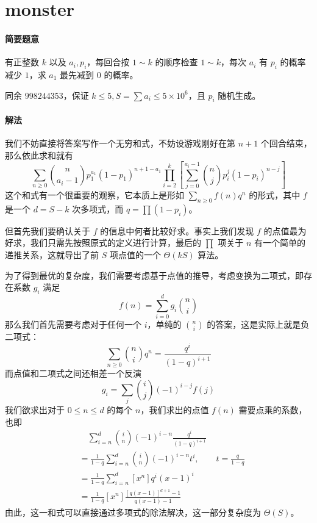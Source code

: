 \documentclass[12pt]{ctexart}
\theoremstyle{theorem}
\theoremstyle{theorem}
\begin{document}
\newpage

\section{monster}

\paragraph{简要题意} 有正整数 $k$ 以及 $a_i, p_i$，每回合按 $1\sim k$ 的顺序检查 $1\sim k$，每次 $a_i$ 有 $p_i$ 的概率减少 $1$，求 $a_1$ 最先减到 $0$ 的概率。

同余 $998244353$，保证 $k\le 5, S=\sum a_i \le 5\times 10^6$，且 $p_i$ 随机生成。

\paragraph{解法}

我们不妨直接将答案写作一个无穷和式，不妨设游戏刚好在第 $n+1$ 个回合结束，那么依此求和就有
$$
\sum_{n\ge 0} \binom n{a_i-1} p_1^{a_1} (1-p_1)^{n+1-a_1} \prod_{i=2}^k
\left[\sum_{j=0}^{a_i-1} \binom n j p_i^j(1-p_i)^{n-j}\right]
$$
这个和式有一个很重要的观察，它本质上是形如 $\sum_{n\ge 0} f(n) q^n$ 的形式，其中 $f$ 是一个 $d=S - k$ 次多项式，而 $q = \prod (1-p_i)$。

但首先我们要确认关于 $f$ 的信息中何者比较好求。事实上我们发现 $f$ 的点值最为好求，我们只需先按照原式的定义进行计算，最后的 $\prod$ 项关于 $n$ 有一个简单的递推关系，这就导出了前 $S$ 项点值的一个 $\Theta(kS)$ 算法。

为了得到最优的复杂度，我们需要考虑基于点值的推导，考虑变换为二项式，即存在系数 $g_i$ 满足
$$
f(n) = \sum_{i=0}^{d} g_i \binom n i
$$
那么我们首先需要考虑对于任何一个 $i$，单纯的 $\binom n i$ 的答案，这是实际上就是负二项式：
$$
\sum_{n\ge 0} \binom n i q^n = \frac{q^i}{(1-q)^{i+1}}
$$
而点值和二项式之间还相差一个反演
$$
g_i = \sum_j \binom i j (-1)^{i-j} f(j)
$$
我们欲求出对于 $0\le n\le d$ 的每个 $n$，我们求出的点值 $f(n)$ 需要点乘的系数，也即
\begin{align*}
&\quad \sum_{i=n}^{d}\binom i n (-1)^{i-n} \frac{q^i}{(1-q)^{i+1}}\\
&= \frac 1{1-q}\sum_{i=n}^{d}\binom i n (-1)^{i-n} t^i, \qquad t=\frac q{1-q}\\
&= \frac 1{1-q}\sum_{i=n}^{d} [x^n] q^i(x-1)^i\\
&= \frac 1{1-q}[x^n] \frac{[q(x-1)]^{d+1}-1}{q(x-1)-1}
\end{align*}
由此，这一和式可以直接通过多项式的除法解决，这一部分复杂度为 $\Theta(S)$。
\end{document}
